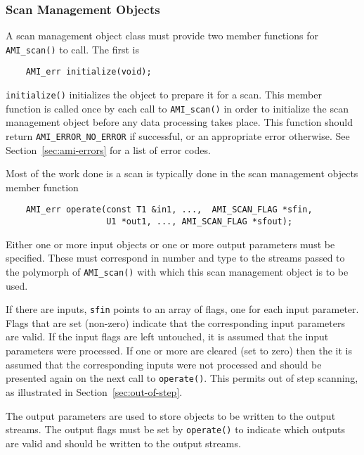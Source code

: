 \subsubsection{Scan Management Objects}  

A scan management object class must provide two member functions for
\verb|AMI_scan()| to call. The first is
\begin{verbatim}
    AMI_err initialize(void);
\end{verbatim}
\verb|initialize()| initializes the object to prepare it for a scan.  This
member function is called once by each call to \verb|AMI_scan()| in order
to initialize the scan management object before any data processing takes
place. This function should return \verb|AMI_ERROR_NO_ERROR| if
successful, or an appropriate error otherwise. See
Section~\ref{sec:ami-errors} for a list of error codes.

Most of the work done is a scan is typically done in the scan management
objects member function
\begin{verbatim}
    AMI_err operate(const T1 &in1, ...,  AMI_SCAN_FLAG *sfin,
                    U1 *out1, ..., AMI_SCAN_FLAG *sfout);
\end{verbatim}

Either one or more input objects or one or more output parameters must
be specified.  These must correspond in number and type to the streams
passed to the polymorph of \verb|AMI_scan()| with which this scan
management object is to be used.

If there are inputs, \verb|sfin| points to an array of flags, one for each
input parameter.  Flags that are set (non-zero) indicate that the
corresponding input parameters are valid.  If the input flags are left
untouched, it is assumed that the input parameters were processed.  If one
or more are cleared (set to zero) then the it is assumed that the
corresponding inputs were not processed and should be presented again on
the next call to \verb|operate()|.  This permits out of step
scanning, as illustrated in
Section~\ref{sec:out-of-step}.

The output parameters are used to store objects to be written to the output
streams. The output flags must be set by \verb|operate()| to indicate which
outputs are valid and should be written to the output streams. 

